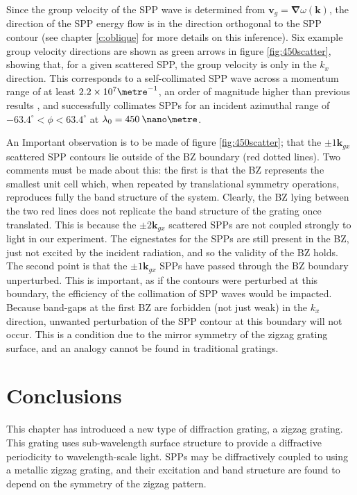 Since the group velocity of the SPP wave is determined from $\mathbf{v}_g=\mathbf{\nabla}\omega(\mathbf{k})$, the direction of the SPP energy flow is in the direction orthogonal to the SPP contour (see chapter \ref{c:oblique} for more details on this inference).  Six example group velocity directions are shown as green arrows in figure \ref{fig:450scatter}, showing that, for a given scattered SPP, the group velocity is only in the $k_x$ direction. This corresponds to a self-collimated SPP wave across a momentum range of at least $2.2\times10^{7} \metre^{-1}$, an order of magnitude higher than previous results \cite{Stein2012}, and successfully collimates SPPs for an incident azimuthal range of $-63.4^\circ<\phi<63.4^\circ$ at $\lambda_0=450\:\nano\metre$. 

An Important observation is to be made of figure \ref{fig:450scatter}; that the $\pm 1\mathbf{k}_{gx}$ scattered SPP contours lie outside of the BZ boundary (red dotted lines). Two comments must be made about this: the first is that the BZ represents the smallest unit cell which, when repeated by translational symmetry operations, reproduces fully the band structure of the system. Clearly, the BZ lying between the two red lines does not replicate the band structure of the grating once translated. This is because the $\pm 2\mathbf{k}_{gx}$ scattered SPPs are not coupled strongly to light in our experiment. The eignestates for the SPPs are still present in the BZ, just not excited by the incident radiation, and so the validity of the BZ holds.
The second point is that the $\pm 1\mathbf{k}_{gx}$ SPPs have passed through the BZ boundary unperturbed. This is important, as if the contours were perturbed at this boundary, the efficiency of the collimation of SPP waves would be impacted. Because band-gaps at the first BZ are forbidden (not just weak) in the $k_x$ direction, unwanted perturbation of the SPP contour at this boundary will not occur. This is a condition due to the mirror symmetry of the zigzag grating surface, and an analogy cannot be found in traditional gratings.


\section{Conclusions}
This chapter has introduced a new type of diffraction grating, a zigzag grating. This grating uses sub-wavelength surface structure to provide a diffractive periodicity to wavelength-scale light. SPPs may be diffractively coupled to using a metallic zigzag grating, and their excitation and band structure are found to depend on the symmetry of the zigzag pattern.

